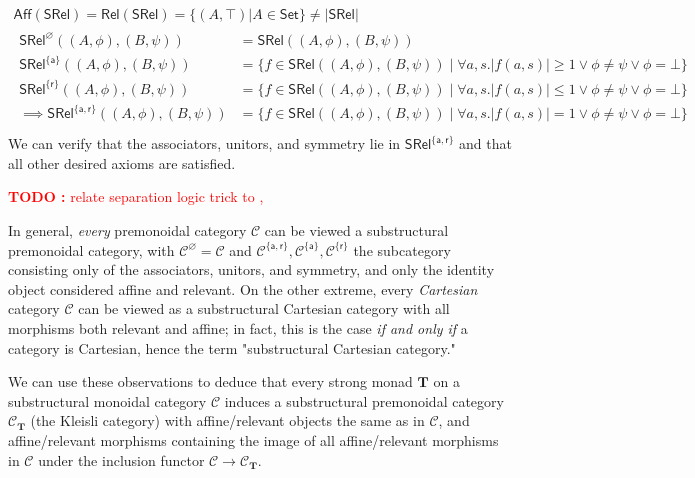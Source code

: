 \documentclass[acmsmall,screen,review]{acmart}
\newcounter{todos}
\newcommand{\TODO}[1]{{
  \stepcounter{todos}
  \begin{center}\large{\textcolor{red}{\textbf{TODO \arabic{todos}:} #1}}\end{center}
}}
\newcommand{\mc}[1]{\ensuremath{\mathcal{#1}}}
\newcommand{\mb}[1]{\ensuremath{\mathbf{#1}}}
\newcommand{\ms}[1]{\ensuremath{\mathsf{#1}}}
\begin{document}
\begin{equation}
  \begin{gathered}
  \ms{Aff}(\ms{SRel}) = \ms{Rel}(\ms{SRel}) = \{(A, \top) | A \in \ms{Set}\} \neq |\ms{SRel}|
  \\
  \begin{aligned}
    \ms{SRel}^\varnothing((A, \phi), (B, \psi))
    &= \ms{SRel}((A, \phi), (B, \psi)) \\
    \ms{SRel}^{\{\ms{a}\}}((A, \phi), (B, \psi)) 
    &= \{f \in \ms{SRel}((A, \phi), (B, \psi)) \mid \forall a, s. |f(a, s)| \geq 1 \lor \phi \neq \psi \lor \phi = \bot \} \\
    \ms{SRel}^{\{\ms{r}\}}((A, \phi), (B, \psi)) 
    &= \{f \in \ms{SRel}((A, \phi), (B, \psi)) \mid \forall a, s. |f(a, s)| \leq 1 \lor \phi \neq \psi \lor \phi = \bot \} \\
    \implies \ms{SRel}^{\{\ms{a}, \ms{r}\}}((A, \phi), (B, \psi)) 
    &= \{f \in \ms{SRel}((A, \phi), (B, \psi)) \mid \forall a, s. |f(a, s)| = 1 \lor \phi \neq \psi \lor \phi = \bot \} \\
  \end{aligned}
  \end{gathered}
\end{equation}
We can verify that the associators, unitors, and symmetry lie in \(\ms{SRel}^{\{\ms{a}, \ms{r}\}}\) and that all other desired axioms are satisfied.

\TODO{relate separation logic trick to \cite{promonad}, \cite{linear-state-usage}}

In general, \textit{every} premonoidal category \(\mc{C}\) can be viewed a substructural premonoidal category, with \(\mc{C}^\varnothing = \mc{C}\) and \(\mc{C}^{\{\ms{a}, \ms{r}\}}, \mc{C}^{\{\ms{a}\}}, \mc{C}^{\{\ms{r}\}}\) the subcategory consisting only of the associators, unitors, and symmetry, and only the identity object considered affine and relevant. On the other extreme, every \textit{Cartesian} category \(\mc{C}\) can be viewed as a substructural Cartesian category with all morphisms both relevant and affine; in fact, this is the case \textit{if and only if} a category is Cartesian, hence the term "substructural Cartesian category."

We can use these observations to deduce that every strong monad \(\mb{T}\) on a substructural monoidal category \(\mc{C}\) induces a substructural premonoidal category \(\mc{C}_{\mb{T}}\) (the Kleisli category) with affine/relevant objects the same as in \(\mc{C}\), and affine/relevant morphisms containing the image of all affine/relevant morphisms in \(\mc{C}\) under the inclusion functor \(\mc{C} \to \mc{C}_{\mb{T}}\).
\end{document}
